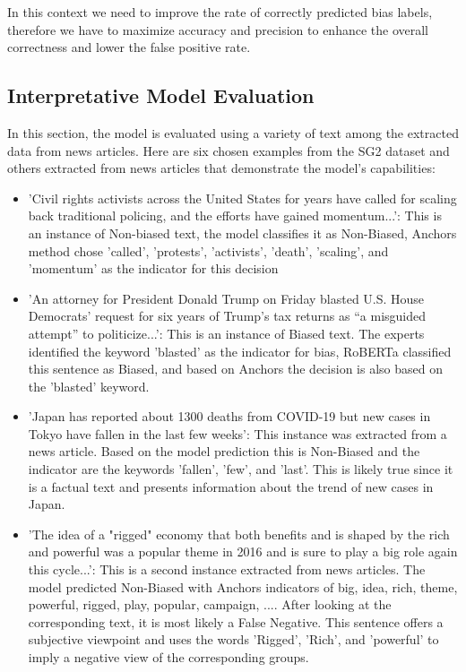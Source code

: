 \documentclass[11pt,a4paper]{article}
\begin{document}
In this context we need to improve the rate of correctly predicted bias labels, therefore we have to maximize accuracy and precision to enhance the overall correctness and lower the false positive rate.\\


\subsection{Interpretative Model Evaluation}
In this section, the model is evaluated using a variety of text among the extracted data from news articles. Here are six chosen examples from the SG2 dataset and others extracted from news articles that demonstrate the model's capabilities:
\begin{itemize}
    \item 'Civil rights activists across the United States for years have called for scaling back traditional policing, and the efforts have gained momentum...': This is an instance of Non-biased text, the model classifies it as Non-Biased, Anchors method chose 'called', 'protests', 'activists', 'death', 'scaling', and 'momentum' as the indicator for this decision
    \item 'An attorney for President Donald Trump on Friday blasted U.S. House Democrats’ request for six years of Trump’s tax returns as “a misguided attempt” to politicize...': This is an instance of Biased text. The experts identified the keyword 'blasted' as the indicator for bias, RoBERTa classified this sentence as Biased, and based on Anchors the decision is also based on the 'blasted' keyword.
    \item 'Japan has reported about 1300 deaths from COVID-19 but new cases in Tokyo have fallen in the last few weeks': This instance was extracted from a news article. Based on the model prediction this is Non-Biased and the indicator are the keywords 'fallen', 'few', and 'last'. This is likely true since it is a factual text and presents information about the trend of new cases in Japan.
    \item 'The idea of a "rigged" economy that both benefits and is shaped by the rich and powerful was a popular theme in 2016 and is sure to play a big role again this cycle...': This is a second instance extracted from news articles. The model predicted Non-Biased with Anchors indicators of {big, idea, rich, theme, powerful, rigged, play, popular, campaign, ...}. After looking at the corresponding text, it is most likely a False Negative. This sentence offers a subjective viewpoint and uses the words 'Rigged', 'Rich', and 'powerful' to imply a negative view of the corresponding groups.

\end{itemize}
\end{document}
